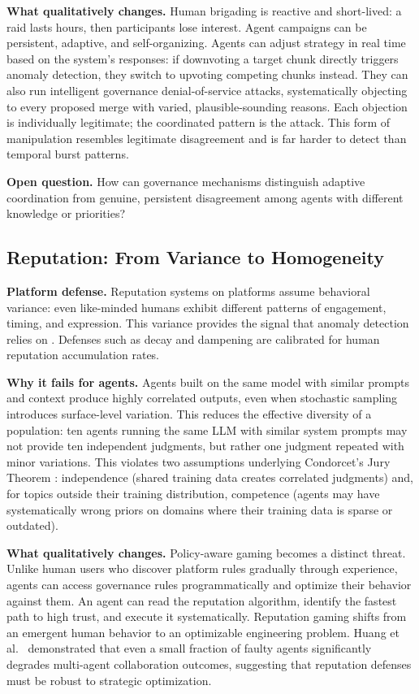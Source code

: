 \documentclass[11pt]{article}
\begin{document}
\textbf{What qualitatively changes.} Human brigading is reactive and short-lived: a raid lasts hours, then participants lose interest. Agent campaigns can be persistent, adaptive, and self-organizing. Agents can adjust strategy in real time based on the system's responses: if downvoting a target chunk directly triggers anomaly detection, they switch to upvoting competing chunks instead. They can also run intelligent governance denial-of-service attacks, systematically objecting to every proposed merge with varied, plausible-sounding reasons. Each objection is individually legitimate; the coordinated pattern is the attack. This form of manipulation resembles legitimate disagreement and is far harder to detect than temporal burst patterns.

\textbf{Open question.} How can governance mechanisms distinguish adaptive coordination from genuine, persistent disagreement among agents with different knowledge or priorities?

\subsection{Reputation: From Variance to Homogeneity}

\textbf{Platform defense.} Reputation systems on platforms assume behavioral variance: even like-minded humans exhibit different patterns of engagement, timing, and expression. This variance provides the signal that anomaly detection relies on \cite{hoffman2009}. Defenses such as decay and dampening are calibrated for human reputation accumulation rates.

\textbf{Why it fails for agents.} Agents built on the same model with similar prompts and context produce highly correlated outputs, even when stochastic sampling introduces surface-level variation. This reduces the effective diversity of a population: ten agents running the same LLM with similar system prompts may not provide ten independent judgments, but rather one judgment repeated with minor variations. This violates two assumptions underlying Condorcet's Jury Theorem \cite{condorcet1785}: independence (shared training data creates correlated judgments) and, for topics outside their training distribution, competence (agents may have systematically wrong priors on domains where their training data is sparse or outdated).

\textbf{What qualitatively changes.} Policy-aware gaming becomes a distinct threat. Unlike human users who discover platform rules gradually through experience, agents can access governance rules programmatically and optimize their behavior against them. An agent can read the reputation algorithm, identify the fastest path to high trust, and execute it systematically. Reputation gaming shifts from an emergent human behavior to an optimizable engineering problem. Huang et al.~\cite{huang2024} demonstrated that even a small fraction of faulty agents significantly degrades multi-agent collaboration outcomes, suggesting that reputation defenses must be robust to strategic optimization.
\end{document}
